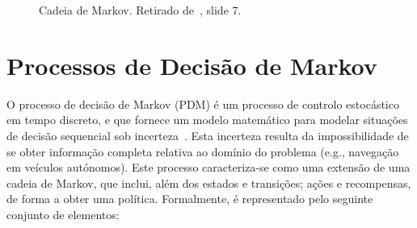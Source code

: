 \begin{figure}[H]
    \begin{center}
    \end{center}
    \caption{Cadeia de Markov.
    Retirado de~\cite{isel:iasa:slides:processos-decisao-sequencial}, slide 7.}
    \label{fig:cadeia-de-markov}
\end{figure}


\section{Processos de Decisão de Markov}\label{sec:processos-de-decisao-de-markov}

O processo de decisão de Markov (PDM) é um processo de controlo estocástico em tempo discreto, e que fornece um modelo matemático para modelar situações de decisão sequencial sob incerteza~\cite{wiki:markov-decision-process}.
Esta incerteza resulta da impossibilidade de se obter informação completa relativa ao domínio do problema (e.g., navegação em veículos autónomos).
Este processo caracteriza-se como uma extensão de uma cadeia de Markov, que inclui, além dos estados e transições; ações e recompensas, de forma a obter uma política.
Formalmente, é representado pelo seguinte conjunto de elementos:

